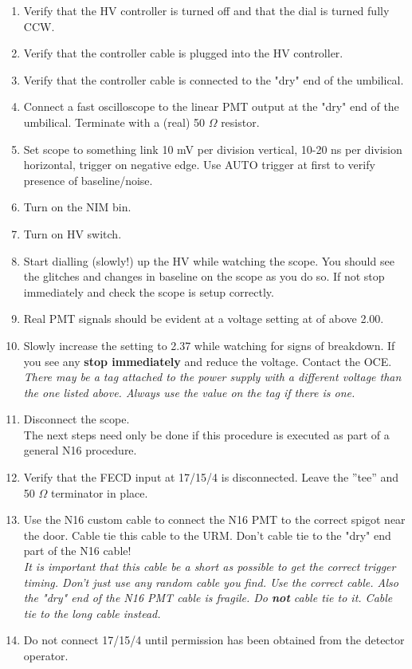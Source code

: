 \begin{enumerate}
\item \CheckBox[name=n16pmt1]{} Verify that the HV controller is turned off and that the dial is turned fully CCW.
\item \CheckBox[name=n16pmt2]{} Verify that the controller cable is plugged into the HV controller.
\item \CheckBox[name=n16pmt3]{} Verify that the controller cable is connected to the "dry" end of the umbilical.
\item \CheckBox[name=n16pmt4]{} Connect a fast oscilloscope to the linear PMT output at the "dry" end of the umbilical. Terminate with a (real) 50 $\Omega$ resistor.
\item \CheckBox[name=n16pmt5]{} Set scope to something link 10 mV per division vertical, 10-20 ns per division horizontal, trigger on negative edge. Use AUTO trigger at first to verify presence of baseline/noise.
\item \CheckBox[name=n16pmt6]{} Turn on the NIM bin.
\item \CheckBox[name=n16pmt7]{} Turn on HV switch.
\item \CheckBox[name=n16pmt8]{} Start dialling (slowly!) up the HV while watching the scope. You should see the glitches and changes in baseline on the scope as you do so. If not stop immediately and check the scope is setup correctly.
\item \CheckBox[name=n16pmt9]{} Real PMT signals should be evident at a voltage setting at of above 2.00.
\item \CheckBox[name=n16pmt10]{} Slowly increase the setting to 2.37 while watching for signs of breakdown. If you see any {\bf stop immediately} and reduce the voltage. Contact the OCE. {\it There may be a tag attached to the power supply with a different voltage than the one listed above. Always use the value on the tag if there is one.}
\item \CheckBox[name=n16pmt11]{} Disconnect the scope.\\ The next steps need only be done if this procedure is executed as part of a general N16 procedure.
\item \CheckBox[name=n16pmt12]{} Verify that the FECD input at 17/15/4
  is disconnected. Leave the ''tee'' and 50 $\Omega$ terminator in place.
\item \CheckBox[name=n16pmt13]{} Use the N16 custom cable to connect the N16 PMT to the correct spigot near the door. Cable tie this cable to the URM. Don't cable tie to the "dry" end part of the N16 cable! \\ {\it It is important that this cable be a short as possible to get the correct trigger timing. Don't just use any random cable you find. Use the correct cable. Also the "dry" end of the N16 PMT cable is fragile. Do {\bf not} cable tie to it. Cable tie to the long cable instead.}
\item \CheckBox[name=n16pmt14]{} Do not connect 17/15/4 until permission has been obtained from the detector operator.
\end{enumerate}

